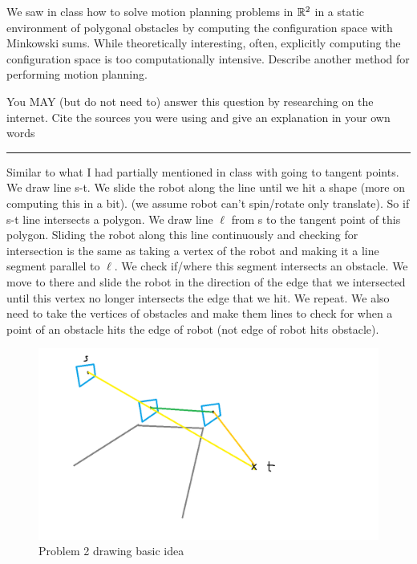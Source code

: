 \documentclass[11pt]{article}
\begin{document}

We saw in class how to solve motion planning problems in $\mathbb{R}^2$ in a static
environment of polygonal obstacles by computing the configuration space with
Minkowski sums.  While theoretically interesting, often, explicitly computing
the configuration space is too computationally intensive.  Describe another
method for performing motion planning.

You MAY (but do not need to) answer this question by researching on the
internet. Cite the sources you were using and give an explanation in your own
words

\hrule

Similar to what I had partially mentioned in class with going to tangent points. 
We draw line s-t. We slide the robot along the line until we hit a shape (more on computing this in a bit).
(we assume robot can't spin/rotate only translate). 
So if s-t line intersects a polygon. We draw line $\ell$ from s to the tangent point of this polygon.
Sliding the robot along this line continuously and checking for intersection is the same as
taking a vertex of the robot and making it a line segment parallel to $\ell$.
We check if/where this segment intersects an obstacle. We move to there 
and slide the robot in the direction of the edge that we intersected until this vertex no longer intersects
the edge that we hit. We repeat.
We also need to take the vertices of obstacles and make them lines to check for when a point
of an obstacle hits the edge of robot (not edge of robot hits obstacle).


\begin{figure}[h]
    \centering
    \includegraphics[scale = 0.5]{problem2.png}
    \caption{Problem 2 drawing basic idea }
\end{figure}
\end{document}
